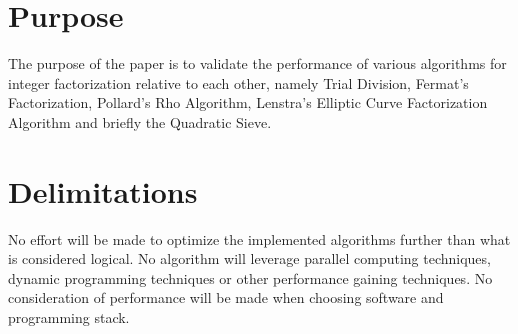 \section{Purpose}

The purpose of the paper is to validate the performance of various algorithms for integer factorization relative to each other, namely Trial Division, Fermat's Factorization, Pollard's Rho Algorithm, Lenstra's Elliptic Curve Factorization Algorithm and briefly the Quadratic Sieve.

\section{Delimitations}

No effort will be made to optimize the implemented algorithms further than what is considered logical. No algorithm will leverage parallel computing techniques, dynamic programming techniques or other performance gaining techniques. No consideration of performance will be made when choosing software and programming stack.